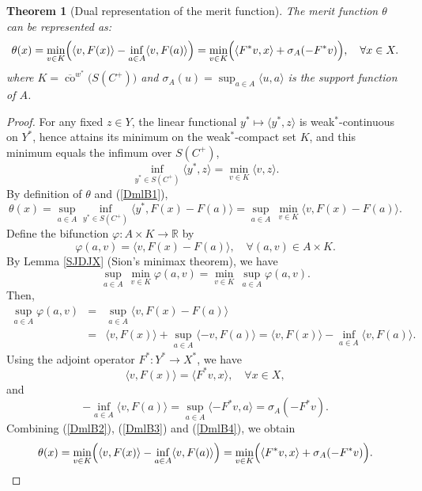 \documentclass[11pt]{article}
\newtheorem{theorem}{Theorem}[section]
\begin{document}
\begin{theorem}[Dual representation of the merit function]\label{YDOBS}
	The merit function $\theta$ can be represented as:
	\[
	\theta(x)=\min_{v\in K}\Bigl(\langle v,F(x)\rangle -\inf_{a\in A}\langle v,F(a)\rangle\Bigr)
	=\min_{v\in K}\Bigl(\langle F^*v, x\rangle+\sigma_A(-F^*v)\Bigr), \quad \forall x\in X.
	\]
	where $K=\overline{\operatorname{co}}^{w^*}\bigl(S(C^+)\bigr)$ and $\sigma_A(u)=\sup_{a\in A}\langle u,a\rangle$ is the support function of $A$.
\end{theorem}

\begin{proof}	For any fixed $z\in Y$, the linear functional $y^*\mapsto\langle y^*,z\rangle$ is weak$^*$-continuous on $Y^*$, hence attains its minimum on the weak$^*$-compact set $K$, and this minimum equals the infimum over $S(C^+)$, 
\begin{equation}\label{DmlB1}
	\inf_{y^*\in S(C^+)}\langle y^*,z\rangle = \min_{v\in K}\langle v,z\rangle .  
 \end{equation}
	By definition of $\theta$ and  (\ref{DmlB1}),
\begin{equation}\label{DmlB2}
	\theta(x) = \sup_{a\in A} \inf_{y^*\in S(C^+)} \langle y^*, F(x)-F(a)\rangle
	= \sup_{a\in A}\, \min_{v\in K} \langle v, F(x)-F(a)\rangle .  
 \end{equation}
	Define the bifunction $\varphi : A\times K  \to  \mathbb{R} $ by
	\[
	\varphi(a,v) = \langle v, F(x)-F(a)\rangle , \quad   \forall   (a,v)\in A\times K .
	\]
 	By Lemma \ref{SJDJX} (Sion's minimax theorem), we have
\begin{equation}\label{DmlB3}
	\sup_{a\in A}\, \min_{v\in K} \varphi(a,v) = \min_{v\in K}\, \sup_{a\in A} \varphi(a,v).  
\end{equation}
	Then,
	\begin{eqnarray} \label{DmlB4}
		\sup_{a\in A}\varphi(a,v) &=& \sup_{a\in A}\langle v, F(x)-F(a)\rangle \nonumber\\ 
		&=& \langle v, F(x)\rangle + \sup_{a\in A}\langle -v, F(a)\rangle  		 = \langle v, F(x)\rangle - \inf_{a\in A}\langle v, F(a)\rangle .
\end{eqnarray}
	Using the adjoint operator $F^*:Y^*\to X^*$, we have
	$$\langle v, F(x)\rangle = \langle F^*v, x\rangle, \quad \forall x\in X,$$
	and
	\[
	-\inf_{a\in A}\langle v, F(a)\rangle = \sup_{a\in A}\langle -F^*v, a\rangle = \sigma_A(-F^*v).
	\]
	Combining (\ref{DmlB2}), (\ref{DmlB3})  and  (\ref{DmlB4}), we obtain
	\[
	\theta(x) = \min_{v\in K} \Bigl( \langle v, F(x)\rangle - \inf_{a\in A}\langle v, F(a)\rangle \Bigr)
	= \min_{v\in K} \Bigl( \langle F^*v, x\rangle + \sigma_A(-F^*v) \Bigr).
	\]
\end{proof}
\end{document}

